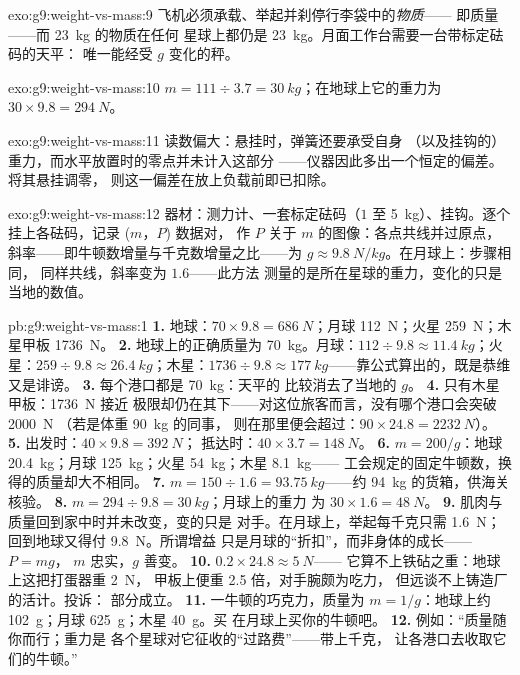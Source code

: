 \begin{solution}{exo:g9:weight-vs-mass:9}
飞机必须承载、举起并刹停行李袋中的\emph{物质}——
即质量——而 \qty{23}{kg} 的物质在任何
星球上都仍是 \qty{23}{kg}。月面工作台需要一台带标定砝码的天平：
唯一能经受 $g$ 变化的秤。
\end{solution}

\begin{solution}{exo:g9:weight-vs-mass:10}
$m = 111 \div 3.7 = \qty{30}{kg}$；在地球上它的重力为 $30
\times 9.8 = \qty{294}{N}$。
\end{solution}

\begin{solution}{exo:g9:weight-vs-mass:11}
读数偏大：悬挂时，弹簧还要承受自身
（以及挂钩的）重力，而水平放置时的零点并未计入这部分
——仪器因此多出一个恒定的偏差。将其悬挂调零，
则这一偏差在放上负载前即已扣除。
\end{solution}

\begin{solution}{exo:g9:weight-vs-mass:12}
器材：测力计、一套标定砝码（$1$ 至
\qty{5}{kg}）、挂钩。逐个挂上各砝码，记录 ($m$，$P$) 数据对，
作 $P$ 关于 $m$ 的图像：各点共线并过原点，
斜率——即牛顿数增量与千克数增量之比——为
$g \approx \qty{9.8}{N/kg}$。在月球上：步骤相同，
同样共线，斜率变为 $1.6$——此方法
测量的是所在星球的重力，变化的只是
当地的数值。
\end{solution}

\begin{solution}{pb:g9:weight-vs-mass:1}
\textbf{1.} 地球：$70 \times 9.8 = \qty{686}{N}$；月球
\qty{112}{N}；火星 \qty{259}{N}；木星甲板
\qty{1736}{N}。
\textbf{2.} 地球上的正确质量为 \qty{70}{kg}。月球：$112 \div
9.8 \approx \qty{11.4}{kg}$；火星：$259 \div 9.8 \approx
\qty{26.4}{kg}$；木星：$1736 \div 9.8 \approx
\qty{177}{kg}$——靠公式算出的，既是恭维又是诽谤。
\textbf{3.} 每个港口都是 \qty{70}{kg}：天平的
比较消去了当地的 $g$。
\textbf{4.} 只有木星甲板：\qty{1736}{N} 接近
极限却仍在其下——对这位旅客而言，没有哪个港口会突破 \qty{2000}{N}
（若是体重 \qty{90}{kg} 的同事，
则在那里便会超过：$90 \times 24.8 = \qty{2232}{N}$）。
\textbf{5.} 出发时：$40 \times 9.8 = \qty{392}{N}$；
抵达时：$40 \times 3.7 = \qty{148}{N}$。
\textbf{6.} $m = 200/g$：地球 \qty{20.4}{kg}；月球
\qty{125}{kg}；火星 \qty{54}{kg}；木星 \qty{8.1}{kg}——
工会规定的固定牛顿数，换得的质量却大不相同。
\textbf{7.} $m = 150 \div 1.6 = \qty{93.75}{kg}$——约
\qty{94}{kg} 的货箱，供海关核验。
\textbf{8.} $m = 294 \div 9.8 = \qty{30}{kg}$；月球上的重力
为 $30 \times 1.6 = \qty{48}{N}$。
\textbf{9.} 肌肉与质量回到家中时并未改变，变的只是
对手。在月球上，举起每千克只需
\qty{1.6}{N}；回到地球又得付 \qty{9.8}{N}。所谓增益
只是月球的“折扣”，而非身体的成长——$P = m g$，
$m$ 忠实，$g$ 善变。
\textbf{10.} $0.2 \times 24.8 \approx \qty{5}{N}$——
它算不上铁砧之重：地球上这把打蛋器重 \qty{2}{N}，
甲板上便重 2.5 倍，对手腕颇为吃力，
但远谈不上铸造厂的活计。投诉：
部分成立。
\textbf{11.} 一牛顿的巧克力，质量为 $m = 1/g$：地球上约
\qty{102}{g}；月球 \qty{625}{g}；木星 \qty{40}{g}。买
在月球上买你的牛顿吧。
\textbf{12.} 例如：“质量随你而行；重力是
各个星球对它征收的“过路费”——带上千克，
让各港口去收取它们的牛顿。”
\end{solution}
